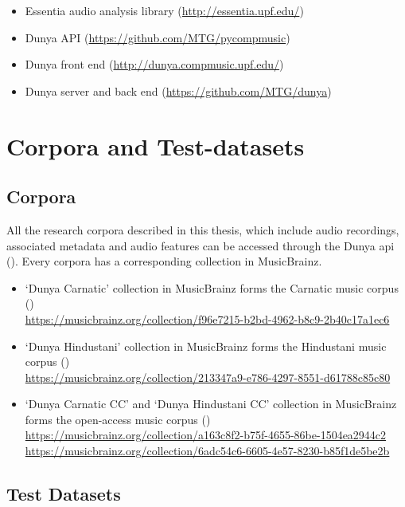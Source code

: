 \begin{itemize}
	\item Essentia audio analysis library (\url{http://essentia.upf.edu/})
	\item Dunya API  (\url{https://github.com/MTG/pycompmusic})
	\item Dunya front end  (\url{http://dunya.compmusic.upf.edu/})
	\item Dunya server and back end  (\url{https://github.com/MTG/dunya})
\end{itemize}


\section*{Corpora and Test-datasets}

\subsection*{Corpora}

All the research corpora described in this thesis, which include audio recordings, associated metadata and audio features can be accessed through the Dunya \acrshort{api} (). Every corpora has a corresponding collection in MusicBrainz.

\begin{itemize}
	\item `Dunya Carnatic' collection in MusicBrainz forms the Carnatic music corpus () \\ \url{https://musicbrainz.org/collection/f96e7215-b2bd-4962-b8c9-2b40c17a1ec6}
	\item `Dunya Hindustani' collection in MusicBrainz forms the Hindustani music corpus () \\
	\url{https://musicbrainz.org/collection/213347a9-e786-4297-8551-d61788c85c80}
	\item `Dunya Carnatic CC' and `Dunya Hindustani CC' collection in MusicBrainz forms the open-access music corpus () \\
	\url{https://musicbrainz.org/collection/a163c8f2-b75f-4655-86be-1504ea2944c2}\\
	\url{https://musicbrainz.org/collection/6adc54c6-6605-4e57-8230-b85f1de5be2b}
\end{itemize}

\subsection*{Test Datasets}

